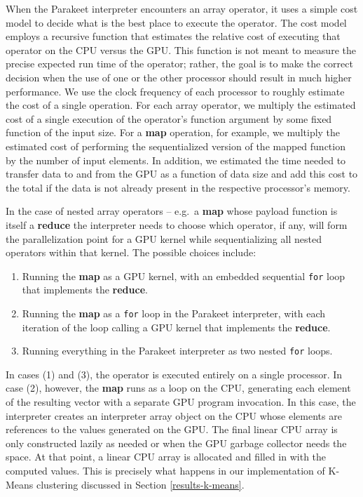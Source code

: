 \documentclass[preprint]{sigplanconf}
\begin{document}
When the Parakeet interpreter encounters an array operator, it uses a simple cost model to decide what is the best place to execute the operator.  The cost model employs a recursive function that estimates the relative cost of executing that operator on the CPU versus the GPU.  This function is not meant to measure the precise expected run time of the operator; rather, the goal is to make the correct decision when the use of one or the other processor should result in much higher performance.  We use the clock frequency of each processor to roughly estimate the cost of a single operation.  For each array operator, we multiply the estimated cost of a single execution of the operator's function argument by some fixed function of the input size.  For a \textbf{map} operation, for example, we multiply the estimated cost of performing the sequentialized version of the mapped function by the number of input elements. In addition, we estimated the time needed to transfer data to and from the GPU as a function of data size and add this cost to the total if the data is not already present in the respective processor's memory.

In the case of nested array operators -- e.g.~a \textbf{map} whose payload function is itself a \textbf{reduce} the interpreter needs to choose which operator, if any, will form the parallelization point for a GPU kernel while sequentializing all nested operators within that kernel.  The possible choices include:

\begin{enumerate}
\item Running the \textbf{map} as a GPU kernel, with an embedded sequential \texttt{for} loop that implements the \textbf{reduce}.
\item Running the \textbf{map} as a \texttt{for} loop in the Parakeet interpreter, with each iteration of the loop calling a GPU kernel that implements the \textbf{reduce}.
\item Running everything in the Parakeet interpreter as two nested \texttt{for} loops.
\end{enumerate}

In cases (1) and (3), the operator is executed entirely on a single processor.  In case (2), however, the \textbf{map} runs as a loop on the CPU, generating each element of the resulting vector with a separate GPU program invocation.  In this case, the interpreter creates an interpreter array object on the CPU whose elements are references to the values generated on the GPU.  The final linear CPU array is only constructed lazily as needed or when the GPU garbage collector needs the space.  At that point, a linear CPU array is allocated and filled in with the computed values.  This is precisely what happens in our implementation of K-Means clustering discussed in Section \ref{results-k-means}.
\end{document}
